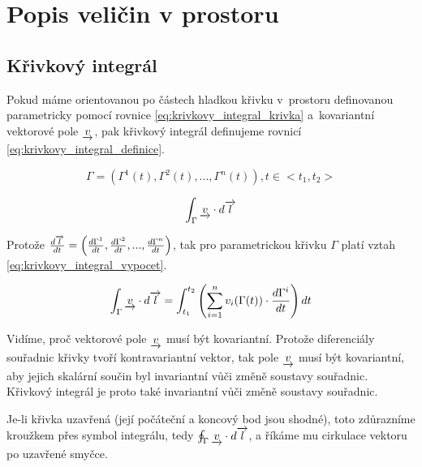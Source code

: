 \chapter{Popis veličin v prostoru}

\section{Křivkový integrál}

Pokud máme orientovanou po částech hladkou křivku v~prostoru definovanou parametricky pomocí rovnice \eqref{eq:krivkovy_integral_krivka} a~kovariantní vektorové pole \(\underrightarrow{v}\), pak křivkový integrál definujeme rovnicí \eqref{eq:krivkovy_integral_definice}.

\begin{equation}
\label{eq:krivkovy_integral_krivka}
\Gamma = (\Gamma^1(t), \Gamma^2(t), ..., \Gamma^n(t)), t \in <t_1, t_2>
\end{equation}

\begin{equation}
\label{eq:krivkovy_integral_definice}
\begin{split}
\int_\Gamma \underrightarrow{v} \cdot d\overrightarrow{l}
\end{split}
\end{equation}

Protože \(\frac{d\overrightarrow{l}}{dt} = \left(\frac{d \Gamma^1}{dt}, \frac{d \Gamma^2}{dt}, ..., \frac{d \Gamma^n}{dt} \right)\), tak pro parametrickou křivku
\(\Gamma\) platí vztah \eqref{eq:krivkovy_integral_vypocet}.

\begin{equation}
\label{eq:krivkovy_integral_vypocet}
\begin{split}
\int_\Gamma \underrightarrow{v} \cdot d\overrightarrow{l} =
\int_{t_1}^{t_2} \left(\sum_{i=1}^n v_i(\Gamma(t)) \cdot \frac{d \Gamma^i}{dt} \right) dt
\end{split}
\end{equation}

Vidíme, proč vektorové pole \(\underrightarrow{v}\) musí být kovariantní. Protože diferenciály souřadnic křivky tvoří kontravariantní vektor, tak pole \(\underrightarrow{v}\) musí být kovariantní, aby jejich skalární součin byl invariantní vůči změně soustavy souřadnic. Křivkový integrál je proto také invariantní vůči změně soustavy souřadnic.

Je-li křivka uzavřená (její počáteční a koncový bod jsou shodné), toto zdůrazníme kroužkem přes symbol integrálu, tedy \(\oint_\Gamma \underrightarrow{v} \cdot d\overrightarrow{l}\), a říkáme mu cirkulace vektoru po uzavřené smyčce.

